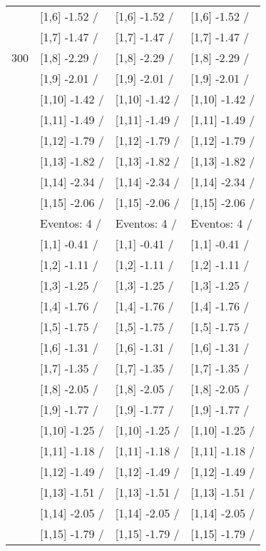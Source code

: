 \begin{table}
\begin{tabular}[t]{llll}
 & {}[1,6] -1.52  / & {}[1,6] -1.52  / & {}[1,6] -1.52  /\\
 & {}[1,7] -1.47  / & {}[1,7] -1.47  / & {}[1,7] -1.47  /\\
300 & {}[1,8] -2.29  / & {}[1,8] -2.29  / & {}[1,8] -2.29  /\\
\addlinespace
 & {}[1,9] -2.01  / & {}[1,9] -2.01  / & {}[1,9] -2.01  /\\
 & {}[1,10] -1.42  / & {}[1,10] -1.42  / & {}[1,10] -1.42  /\\
 & {}[1,11] -1.49  / & {}[1,11] -1.49  / & {}[1,11] -1.49  /\\
 & {}[1,12] -1.79  / & {}[1,12] -1.79  / & {}[1,12] -1.79  /\\
 & {}[1,13] -1.82  / & {}[1,13] -1.82  / & {}[1,13] -1.82  /\\
\addlinespace
 & {}[1,14] -2.34  / & {}[1,14] -2.34  / & {}[1,14] -2.34  /\\
 & {}[1,15] -2.06  / & {}[1,15] -2.06  / & {}[1,15] -2.06  /\\
 & Eventos:  4 / & Eventos:  4 / & Eventos:  4 /\\
 & {}[1,1] -0.41  / & {}[1,1] -0.41  / & {}[1,1] -0.41  /\\
 & {}[1,2] -1.11  / & {}[1,2] -1.11  / & {}[1,2] -1.11  /\\
\addlinespace
 & {}[1,3] -1.25  / & {}[1,3] -1.25  / & {}[1,3] -1.25  /\\
 & {}[1,4] -1.76  / & {}[1,4] -1.76  / & {}[1,4] -1.76  /\\
 & {}[1,5] -1.75  / & {}[1,5] -1.75  / & {}[1,5] -1.75  /\\
 & {}[1,6] -1.31  / & {}[1,6] -1.31  / & {}[1,6] -1.31  /\\
 & {}[1,7] -1.35  / & {}[1,7] -1.35  / & {}[1,7] -1.35  /\\
\addlinespace
500 & {}[1,8] -2.05  / & {}[1,8] -2.05  / & {}[1,8] -2.05  /\\
 & {}[1,9] -1.77  / & {}[1,9] -1.77  / & {}[1,9] -1.77  /\\
 & {}[1,10] -1.25  / & {}[1,10] -1.25  / & {}[1,10] -1.25  /\\
 & {}[1,11] -1.18  / & {}[1,11] -1.18  / & {}[1,11] -1.18  /\\
 & {}[1,12] -1.49  / & {}[1,12] -1.49  / & {}[1,12] -1.49  /\\
\addlinespace
 & {}[1,13] -1.51  / & {}[1,13] -1.51  / & {}[1,13] -1.51  /\\
 & {}[1,14] -2.05  / & {}[1,14] -2.05  / & {}[1,14] -2.05  /\\
 & {}[1,15] -1.79  / & {}[1,15] -1.79  / & {}[1,15] -1.79  /\\
\bottomrule
\end{tabular}
\end{table}
